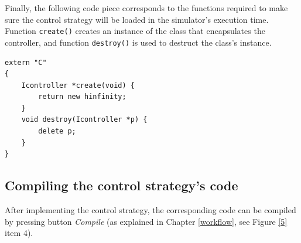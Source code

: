 Finally, the following code piece corresponds to the functions required to make sure the control strategy will be loaded in the simulator's execution time. Function \texttt{create()} creates an instance of the class that encapsulates the controller, and function \texttt{destroy()} is used to destruct the class's instance.

\begin{verbatim}
extern "C"
{ 
	Icontroller *create(void) {
		return new hinfinity;
	}
	void destroy(Icontroller *p) {
		delete p;
	}
}
\end{verbatim}

\subsection{Compiling the control strategy's code}

After implementing the control strategy, the corresponding code can be compiled by pressing button \textit{Compile} (as explained in Chapter \ref{workflow}, see Figure \ref{5} item 4).